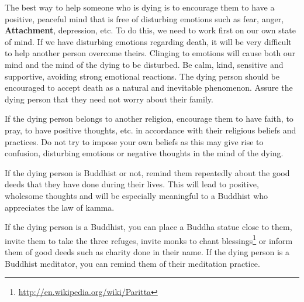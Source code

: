 The best way to help someone who is dying is to encourage them to have a positive, peaceful mind that is free of disturbing emotions such as fear, anger, \textbf{Attachment}, depression, etc. To do this, we need to work first on our own state of mind. If we have disturbing emotions regarding death, it will be very difficult to help another person overcome theirs. Clinging to emotions will cause both our mind and the mind of the dying to be disturbed. Be calm, kind, sensitive and supportive, avoiding strong emotional reactions. The dying person should be encouraged to accept death as a natural and inevitable phenomenon. Assure the dying person that they need not worry about their family.

If the dying person belongs to another religion, encourage them to have faith, to pray, to have positive thoughts, etc. in accordance with their religious beliefs and practices. Do not try to impose your own beliefs as this may give rise to confusion, disturbing emotions or negative thoughts in the mind of the dying.

If the dying person is Buddhist or not, remind them repeatedly about the good deeds that they have done during their lives. This will lead to positive, wholesome thoughts and will be especially meaningful to a Buddhist who appreciates the law of kamma.

If the dying person is a Buddhist, you can place a Buddha statue close to them, invite them to take the three refuges, invite monks to chant blessings\footnote{\url{ http://en.wikipedia.org/wiki/Paritta}} or inform them of good deeds such as charity done in their name. If the dying person is a Buddhist meditator, you can remind them of their meditation practice.